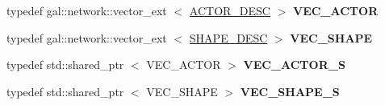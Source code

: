 \begin{DoxyCompactItemize}
\item 
\hypertarget{classglutpp_1_1actor_1_1desc_a92414c962dc6c5f87ec4ced7e9282705}{typedef \*
gal\-::network\-::vector\-\_\-ext\*
$<$ \hyperlink{classglutpp_1_1actor_1_1desc}{\-A\-C\-T\-O\-R\-\_\-\-D\-E\-S\-C} $>$ {\bfseries \-V\-E\-C\-\_\-\-A\-C\-T\-O\-R}}\label{classglutpp_1_1actor_1_1desc_a92414c962dc6c5f87ec4ced7e9282705}

\item 
\hypertarget{classglutpp_1_1actor_1_1desc_abba546c190c308fefc04d70fb95959c7}{typedef \*
gal\-::network\-::vector\-\_\-ext\*
$<$ \hyperlink{classglutpp_1_1shape_1_1desc}{\-S\-H\-A\-P\-E\-\_\-\-D\-E\-S\-C} $>$ {\bfseries \-V\-E\-C\-\_\-\-S\-H\-A\-P\-E}}\label{classglutpp_1_1actor_1_1desc_abba546c190c308fefc04d70fb95959c7}

\item 
\hypertarget{classglutpp_1_1actor_1_1desc_a7557044ed7c3a12820ff0935a9498367}{typedef std\-::shared\-\_\-ptr\*
$<$ \-V\-E\-C\-\_\-\-A\-C\-T\-O\-R $>$ {\bfseries \-V\-E\-C\-\_\-\-A\-C\-T\-O\-R\-\_\-\-S}}\label{classglutpp_1_1actor_1_1desc_a7557044ed7c3a12820ff0935a9498367}

\item 
\hypertarget{classglutpp_1_1actor_1_1desc_a93fbd1571b9949834c5b05562b513a4c}{typedef std\-::shared\-\_\-ptr\*
$<$ \-V\-E\-C\-\_\-\-S\-H\-A\-P\-E $>$ {\bfseries \-V\-E\-C\-\_\-\-S\-H\-A\-P\-E\-\_\-\-S}}\label{classglutpp_1_1actor_1_1desc_a93fbd1571b9949834c5b05562b513a4c}

\end{DoxyCompactItemize}
